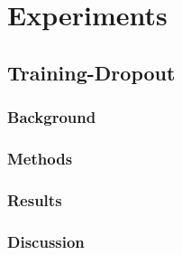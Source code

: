 \chapter{Experiments}

\section{Training-Dropout}
    \subsection{Background}
    \subsection{Methods}
    \subsection{Results}
    \subsection{Discussion}
